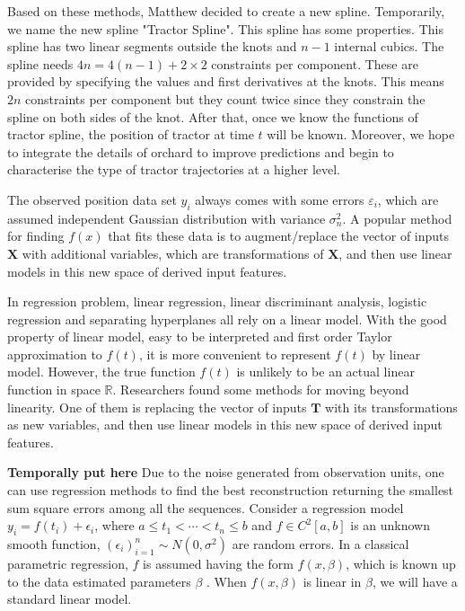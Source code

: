 Based on these methods, Matthew decided to create a new spline. Temporarily, we name the new spline "Tractor Spline". This spline has some properties. This spline has two linear segments outside the knots and $n-1$ internal cubics. The  spline needs $4n = 4(n -1)+ 2\times 2$ constraints per component. These are provided by specifying the values and first derivatives at the knots. This means $2n$ constraints per component but they count twice since they constrain the spline on both sides of the knot. After that, once we know the functions of tractor spline, the position of tractor at time $t$ will be known. Moreover, we hope to integrate the details of orchard to improve predictions and begin to characterise the type of tractor trajectories at a higher level.






The observed position data set $y_i$ always comes with some errors $\varepsilon_i$, which are assumed independent Gaussian distribution with variance $\sigma_n^2$. A popular method for finding $f(x)$ that fits these data is to augment/replace the vector of inputs $\mathbf{X}$ with additional variables, which are transformations of $\mathbf{X}$, and then use linear models in this new space of derived input features.\cite{esl2009}

In regression problem, linear regression, linear discriminant analysis, logistic regression and separating hyperplanes all rely on a linear model. With the good property of linear model, easy to be interpreted and first order Taylor approximation to $f(t)$, it is more convenient to represent $f(t)$ by linear model. However, the true function $f(t)$ is unlikely to be an actual linear function in space $\mathbb{R}$. Researchers found some methods for moving beyond linearity. One of them is replacing the vector of inputs $\mathbf{T}$ with its transformations as new variables, and then use linear models in this new space of derived input features.


\textbf{Temporally put here }Due to the noise generated from observation units, one can use regression methods to find the best reconstruction returning the smallest sum square errors among all the sequences. Consider a regression model $y_i=f(t_i)+\epsilon_i$, where $a \leq t_1 < \cdots < t_n \leq b$ and $f \in \mathit{C}^2[a,b]$ is an unknown smooth function, $(\epsilon_i)_{i=1}^n \sim N(0,\sigma^2)$ are random errors. In a classical parametric regression, $f$ is assumed having the form $f(x,\beta)$, which is known up to the data estimated parameters $\beta$ \cite{kim2004smoothing}. When $f(x,\beta)$ is linear in $\beta$, we will have a standard linear model. 

